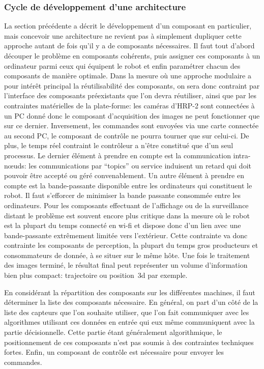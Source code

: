 \subsubsection{Cycle de développement d'une architecture}


La section précédente a décrit le développement d'un composant en
particulier, mais concevoir une architecture ne revient pas à
simplement dupliquer cette approche autant de fois qu'il y a de
composants nécessaires. Il faut tout d'abord découper le problème en
composants cohérents, puis assigner ces composants à un ordinateur
parmi ceux qui équipent le robot et enfin paramétrer chacun des
composants de manière optimale. Dans la mesure où une approche
modulaire a pour intérêt principal la réutilisabilité des composants,
on sera donc contraint par l'interface des composants préexistants que
l'on devra réutiliser, ainsi que par les contraintes matérielles de la
plate-forme: les caméras d'HRP-2 sont connectées à un PC donné donc le
composant d'acquisition des images ne peut fonctionner que sur ce
dernier. Inversement, les commandes sont envoyées via une carte
connectée au second PC, le composant de contrôle ne pourra tourner que
sur celui-ci. De plus, le temps réel contraint le contrôleur a n'être
constitué que d'un seul processus. Le dernier élément à prendre en
compte est la communication intra-n\oe uds: les communications par
``topics'' ou service induisent un retard qui doit pouvoir être
accepté ou géré convenablement. Un autre élément à prendre en compte
est la bande-passante disponible entre les ordinateurs qui constituent
le robot. Il faut s'efforcer de minimiser la bande passante consommée
entre les ordinateurs. Pour les composants effectuant de l'affichage
ou de la surveillance distant le problème est souvent encore plus
critique dans la mesure où le robot est la plupart du temps connecté
en wi-fi et dispose donc d'un lien avec une bande-passante extrêmement
limitée vers l'extérieur. Cette contrainte va donc contrainte les
composants de perception, la plupart du temps gros producteurs et
consommateurs de donnée, à se situer sur le même hôte. Une fois le
traitement des images terminé, le résultat final peut représenter un
volume d'information bien plus compact: trajectoire ou position 3d par
exemple.


En considérant la répartition des composants sur les différentes
machines, il faut déterminer la liste des composants nécessaire. En
général, on part d'un côté de la liste des capteurs que l'on souhaite
utiliser, que l'on fait communiquer avec les algorithmes utilisant ces
données en entrée qui eux même communiquent avec la partie
décisionnelle. Cette partie étant généralement algorithmique, le
positionnement de ces composants n'est pas soumis à des contraintes
techniques fortes. Enfin, un composant de contrôle est nécessaire pour
envoyer les commandes.


